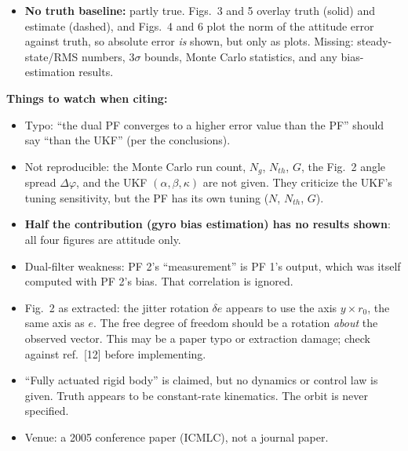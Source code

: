 \documentclass[11pt]{article}
\begin{document}
\begin{itemize}[noitemsep]
\begin{itemize}[noitemsep]
        \item \textit{PF 1, every TAM update (every 10 s)}: also $A(q)r$, the residual, one exp, normalization, $O(N)$ resampling, and 3 more draws for roughening.
        \item With $N = 1500$: about $10^5$ flops + 3000 trig + 4500 Gaussian draws per step. On top of that is PF 2, which propagates attitude for each of its $N_g$ particles.
        \item Ratio: about $N/(2n+1) \approx 1500/13 \approx 100\times$ the UKF's propagation work. RNG and transcendental functions usually dominate on an MCU, so the real ratio may be higher.
        \item Best check: implement both and time them on the target OBC. The per-particle work is embarrassingly parallel.
    \end{itemize}
    \item \textbf{No truth baseline:} partly true. Figs.\ 3 and 5 overlay truth (solid) and estimate (dashed), and Figs.\ 4 and 6 plot the norm of the attitude error against truth, so absolute error \textit{is} shown, but only as plots. Missing: steady-state/RMS numbers, $3\sigma$ bounds, Monte Carlo statistics, and any bias-estimation results.
\end{itemize}

\textbf{Things to watch when citing:}
\begin{itemize}[noitemsep]
    \item Typo: ``the dual PF converges to a higher error value than the PF'' should say ``than the UKF'' (per the conclusions).
    \item Not reproducible: the Monte Carlo run count, $N_g$, $N_{th}$, $G$, the Fig.\ 2 angle spread $\Delta\varphi$, and the UKF $(\alpha,\beta,\kappa)$ are not given. They criticize the UKF's tuning sensitivity, but the PF has its own tuning ($N$, $N_{th}$, $G$).
    \item \textbf{Half the contribution (gyro bias estimation) has no results shown}: all four figures are attitude only.
    \item Dual-filter weakness: PF 2's ``measurement'' is PF 1's output, which was itself computed with PF 2's bias. That correlation is ignored.
    \item Fig.\ 2 as extracted: the jitter rotation $\delta e$ appears to use the axis $y\times r_0$, the same axis as $e$. The free degree of freedom should be a rotation \textit{about} the observed vector. This may be a paper typo or extraction damage; check against ref.\ [12] before implementing.
    \item ``Fully actuated rigid body'' is claimed, but no dynamics or control law is given. Truth appears to be constant-rate kinematics. The orbit is never specified.
    \item Venue: a 2005 conference paper (ICMLC), not a journal paper.
\end{itemize}
\end{document}
